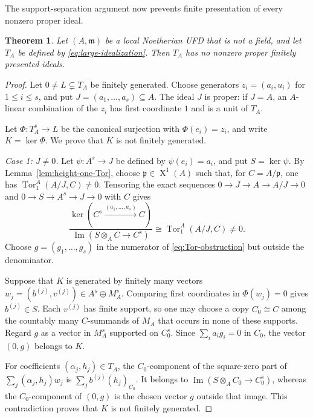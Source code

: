 \documentclass[11pt]{amsart}
\numberwithin{equation}{section}
\newtheorem{theorem}{Theorem}[section]
\theoremstyle{definition}
\theoremstyle{remark}
\newcommand{\Tor}{\operatorname{Tor}}
\newcommand{\SpecOne}{\operatorname{X}^{1}}
\begin{document}
The support-separation argument now prevents finite presentation of every nonzero proper ideal.

\begin{theorem}\label{thm:no-finitely-presented-ideals}
Let $(A,\mathfrak m)$ be a local Noetherian UFD that is not a field, and let $T_A$ be defined by \eqref{eq:large-idealization}.  Then $T_A$ has no nonzero proper finitely presented ideals.
\end{theorem}

\begin{proof}
Let $0\neq L\subsetneq T_A$ be finitely generated.  Choose generators $z_i=(a_i,u_i)$ for $1\leq i\leq s$, and put $J=(a_1,\ldots,a_s)\subseteq A$.  The ideal $J$ is proper: if $J=A$, an $A$-linear combination of the $z_i$ has first coordinate $1$ and is a unit of $T_A$.

Let $\Phi:T_A^s\to L$ be the canonical surjection with $\Phi(e_i)=z_i$, and write $K=\ker\Phi$.  We prove that $K$ is not finitely generated.

\smallskip
\noindent\emph{Case 1: $J\neq0$.}
Let $\psi:A^s\to J$ be defined by $\psi(e_i)=a_i$, and put $S=\ker\psi$.  By Lemma~\ref{lem:height-one-Tor}, choose $\mathfrak p\in\SpecOne(A)$ such that, for $C=A/\mathfrak p$, one has $\Tor_1^A(A/J,C)\neq0$.  Tensoring the exact sequences $0\to J\to A\to A/J\to0$ and $0\to S\to A^s\to J\to0$ with $C$ gives
\begin{equation}\label{eq:Tor-obstruction}
 \frac{\ker(C^s\xrightarrow{(a_1,\ldots,a_s)}C)}
 {\operatorname{Im}(S\otimes_A C\to C^s)}
 \cong\Tor_1^A(A/J,C)\neq0.
\end{equation}
Choose $g=(g_1,\ldots,g_s)$ in the numerator of \eqref{eq:Tor-obstruction} but outside the denominator.

Suppose that $K$ is generated by finitely many vectors $w_j=(b^{(j)},v^{(j)})\in A^s\oplus M_A^s$.  Comparing first coordinates in $\Phi(w_j)=0$ gives $b^{(j)}\in S$.  Each $v^{(j)}$ has finite support, so one may choose a copy $C_0\cong C$ among the countably many $C$-summands of $M_A$ that occurs in none of these supports.  Regard $g$ as a vector in $M_A^s$ supported on $C_0^s$.  Since $\sum_i a_i g_i=0$ in $C_0$, the vector $(0,g)$ belongs to $K$.

For coefficients $(\alpha_j,h_j)\in T_A$, the $C_0$-component of the square-zero part of $\sum_j(\alpha_j,h_j)w_j$ is $\sum_j b^{(j)}(h_j)_{C_0}$.  It belongs to $\operatorname{Im}(S\otimes_A C_0\to C_0^s)$, whereas the $C_0$-component of $(0,g)$ is the chosen vector $g$ outside that image.  This contradiction proves that $K$ is not finitely generated.


\end{proof}
\end{document}
